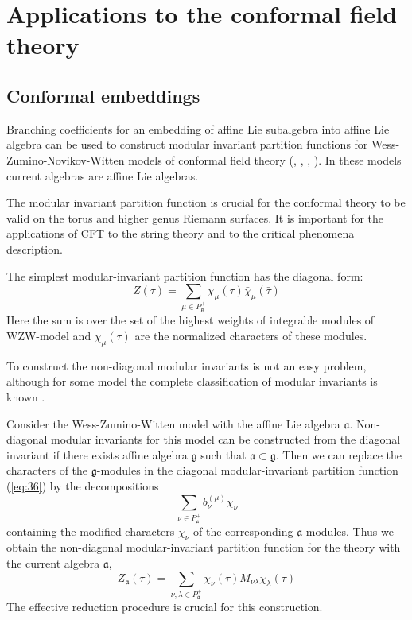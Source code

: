\documentclass[12pt]{iopart}
\begin{document}
\section{Applications to the conformal field theory}
\label{sec:phys-appl}

\subsection{Conformal embeddings}
\label{sec:conformal-embeddings}

Branching coefficients for an embedding of affine Lie subalgebra into
affine Lie algebra can be used to construct modular invariant
partition functions for Wess-Zumino-Novikov-Witten models of conformal field theory (\cite{difrancesco1997cft}, \cite{Walton:1999xc}, \cite{walton1989conformal}, \cite{schellekens1986conformal}). In these models current algebras are affine Lie algebras.

The modular invariant partition function is crucial for the conformal theory to be valid on the torus and higher genus Riemann surfaces. It is important for the applications of CFT to the string theory and to the critical phenomena description. 

The simplest modular-invariant partition function has the diagonal form:
\begin{equation}
  \label{eq:34}
   Z(\tau)=\sum_{ \mu\in P^{+}_{\mathfrak{g}}} \chi_{\mu}(\tau)\bar \chi_{\mu}(\bar \tau)
\end{equation}
Here the sum is over the set of the highest weights of integrable modules of WZW-model and $\chi_{\mu}(\tau)$ are the normalized characters of these modules. 

To construct the non-diagonal modular invariants is not an easy problem, although for some model the complete classification of modular invariants is known \cite{1994hepthGannon,1995JMPGannon}.

Consider the Wess-Zumino-Witten model with the affine Lie algebra $\mathfrak{a}$. Non-diagonal modular invariants for this model can be constructed from the diagonal invariant if there exists affine algebra $\mathfrak{g}$ such that $\mathfrak{a}\subset\mathfrak{g}$. 
Then we can replace the characters of the $\mathfrak{g}$-modules in the diagonal modular-invariant partition function (\ref{eq:36})
by the decompositions
\begin{equation}
  \label{eq:32}
\sum_{\nu \in P^{+}_{\mathfrak{a}}}b^{(\mu)}_{\nu} \chi_{\nu}  
\end{equation}
containing the modified characters $\chi_{\nu}$ of the corresponding $\mathfrak{a}$-modules. Thus we obtain the non-diagonal modular-invariant  partition function for the theory with the current algebra $\mathfrak{a}$,
\begin{equation}
  \label{eq:36}
   Z_{\mathfrak{a}}(\tau)=\sum_{ \nu,\lambda\in P^{+}_{\mathfrak{a}}} \chi_{\nu}(\tau)M_{\nu\lambda}\bar \chi_{\lambda}(\bar \tau)
\end{equation}
The effective reduction procedure is crucial for this construction.
\end{document}
